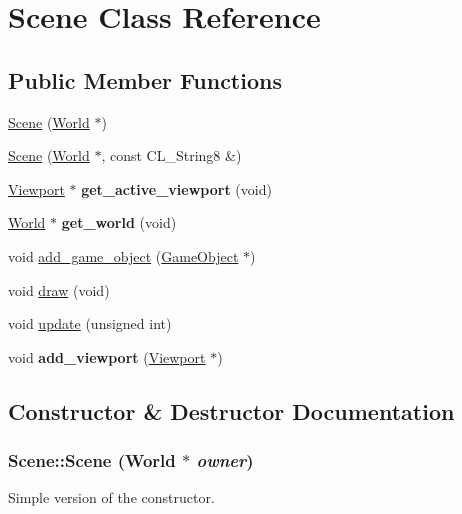 \hypertarget{classScene}{
\section{Scene Class Reference}
\label{classScene}
}
\subsection*{Public Member Functions}
\begin{DoxyCompactItemize}
\item 
\hyperlink{classScene_a4eb3fdb166e0021e4e52fe19f9562183}{Scene} (\hyperlink{classWorld}{World} $\ast$)
\item 
\hyperlink{classScene_a2da1c2abcd1bde49c978e403c9748b04}{Scene} (\hyperlink{classWorld}{World} $\ast$, const CL\_\-String8 \&)
\item 
\hypertarget{classScene_ac880d620e9331ee220eab871769bc26c}{
\hyperlink{classViewport}{Viewport} $\ast$ {\bfseries get\_\-active\_\-viewport} (void)}
\label{classScene_ac880d620e9331ee220eab871769bc26c}

\item 
\hypertarget{classScene_aca4855a051e9198608d26b6d9ae30cdb}{
\hyperlink{classWorld}{World} $\ast$ {\bfseries get\_\-world} (void)}
\label{classScene_aca4855a051e9198608d26b6d9ae30cdb}

\item 
void \hyperlink{classScene_af4940a9c9e62cb5ced3e7f5206d903a3}{add\_\-game\_\-object} (\hyperlink{classGameObject}{GameObject} $\ast$)
\item 
void \hyperlink{classScene_a41fbbe388ea322df338648e66611ffcf}{draw} (void)
\item 
void \hyperlink{classScene_a065d1b88078a09f2b77e80f663a40b2d}{update} (unsigned int)
\item 
\hypertarget{classScene_a8e146347a0f1dbe2231788a8d07d2746}{
void {\bfseries add\_\-viewport} (\hyperlink{classViewport}{Viewport} $\ast$)}
\label{classScene_a8e146347a0f1dbe2231788a8d07d2746}

\end{DoxyCompactItemize}


\subsection{Constructor \& Destructor Documentation}
\hypertarget{classScene_a4eb3fdb166e0021e4e52fe19f9562183}{
\subsubsection[{Scene}]{\setlength{\rightskip}{0pt plus 5cm}Scene::Scene ({\bf World} $\ast$ {\em owner})}}
\label{classScene_a4eb3fdb166e0021e4e52fe19f9562183}
Simple version of the constructor.


